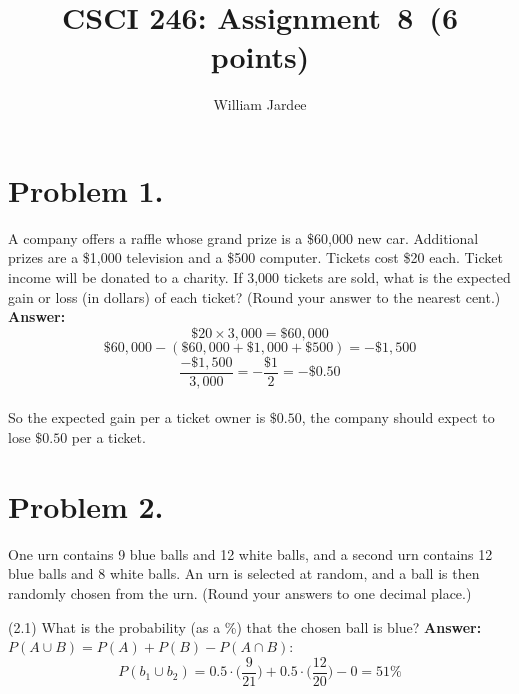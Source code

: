 \documentclass[11pt]{article}
\begin{document}
\date{}

\title{CSCI 246: Assignment~8~(6 points)}

\author{William Jardee}

\maketitle
 
\section*{Problem 1.}

\noindent
A company offers a raffle whose grand prize is a \$60,000 new car. Additional prizes are a \$1,000 television and a \$500 computer. Tickets cost \$20 each. Ticket income will be donated to a charity. If 3,000 tickets are sold, what is the expected gain or loss (in dollars) of each ticket? (Round your answer to the nearest cent.)
\newline
\newline
\newline
\noindent
{\bf Answer:}
\[\$20 \times 3,000 = \$60,000\]
\[\$60,000 - (\$60,000 + \$1,000 + \$500) = - \$1,500\]
\[\frac{-\$1,500}{3,000} = -\frac{\$1}{2} = -\$0.50\]\\
So the expected gain per a ticket owner is $\$0.50$, the company should expect to lose $\$0.50$ per a ticket.
\newpage

\section*{Problem 2.}

\noindent
One urn contains {\color{red}9} blue balls and {\color{red}12} white balls, and a second urn contains {\color{red}12} blue balls and {\color{red}8} white balls. An urn is selected at random, and a ball is then randomly chosen from the
urn. (Round your answers to one decimal place.)
\newline

\noindent
(2.1) What is the probability (as a \%) that the chosen ball is blue?
\newline
\newline
\newline
\noindent
{\bf Answer:}~~\\

$P(A\cup B) = P(A) + P(B) - P(A\cap B)$:
\[P(b_1 \cup b_2) = 0.5\cdot \Big(\frac{9}{21}\Big) + 0.5 \cdot \Big(\frac{12}{20}\Big) - 0= 51\%\]
\newline
\end{document}
